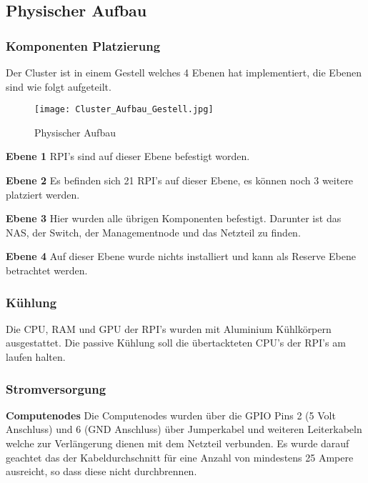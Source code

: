 \subsection{Physischer Aufbau}

\subsubsection{Komponenten Platzierung}
Der Cluster ist in einem Gestell welches 4 Ebenen hat implementiert, die Ebenen sind wie folgt aufgeteilt. \newline

\begin{figure}[htb]
\centering
\texttt{[image: Cluster\_Aufbau\_Gestell.jpg]}
\caption{Physischer Aufbau}
\label{fig:Physischer Aufbau}
\end{figure} 

\textbf{Ebene 1} RPI's sind auf dieser Ebene befestigt worden.

\textbf{Ebene 2}\newline
Es befinden sich 21 RPI's auf dieser Ebene, es können noch 3 weitere platziert werden.

\textbf{Ebene 3}\newline
Hier wurden alle übrigen Komponenten befestigt. Darunter ist das NAS, der Switch, der Managementnode und das Netzteil zu finden.

\textbf{Ebene 4}\newline
Auf dieser Ebene wurde nichts installiert und kann als Reserve Ebene betrachtet werden.

\subsubsection{Kühlung}
Die CPU, RAM und GPU der RPI's wurden mit Aluminium Kühlkörpern ausgestattet. Die passive Kühlung soll die übertackteten CPU's der RPI's am laufen halten.

\subsubsection{Stromversorgung}
\textbf{Computenodes}\newline
Die Computenodes wurden über die GPIO Pins 2 (5 Volt Anschluss) und 6 (GND Anschluss) über Jumperkabel und weiteren Leiterkabeln welche zur Verlängerung dienen mit dem Netzteil verbunden. Es wurde darauf geachtet das der Kabeldurchschnitt für eine Anzahl von mindestens 25 Ampere ausreicht, so dass diese nicht durchbrennen.

